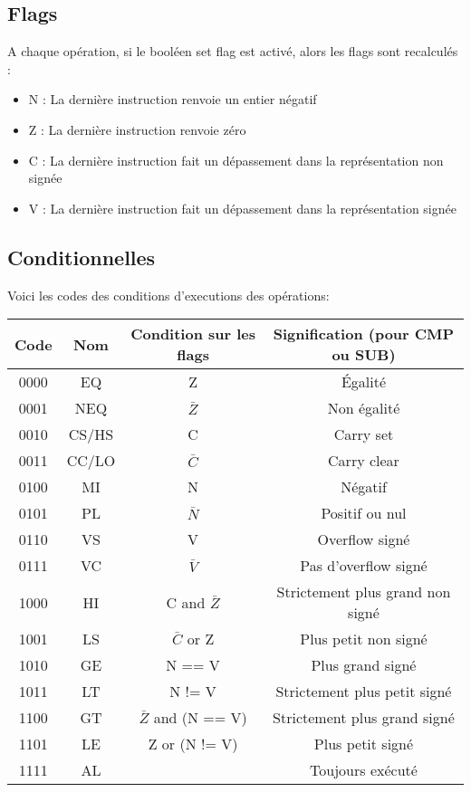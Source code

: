 \documentclass[a4paper]{article}
\begin{document}
\subsection{Flags}

A chaque opération, si le booléen set flag est activé, alors les flags sont
recalculés :
  \begin{itemize}
  \item N : La dernière instruction renvoie un entier négatif
  \item Z : La dernière instruction renvoie zéro
  \item C : La dernière instruction fait un dépassement dans la représentation
    non signée
  \item V : La dernière instruction fait un dépassement dans la représentation
    signée 
  \end{itemize}

  \subsection{Conditionnelles}

  Voici les codes des conditions d'executions des opérations:\\
  
\begin{tabular}{|c|c|c|c|}
  \hline
  Code & Nom & Condition sur les flags & Signification (pour CMP ou SUB)\\
  \hline
  0000 & EQ & Z & Égalité\\
  0001 & NEQ & $\bar{Z}$ & Non égalité\\
  0010 & CS/HS & C & Carry set\\
  0011 & CC/LO & $\bar{C}$ & Carry clear\\
  0100 & MI & N & Négatif \\
  0101 & PL & $\bar{N}$ & Positif ou nul \\
  0110 & VS & V & Overflow signé \\
  0111 & VC & $\bar{V}$ & Pas d'overflow signé \\
  1000 & HI & C and $\bar{Z}$ & Strictement plus grand non signé \\
  1001 & LS & $\bar{C}$ or Z & Plus petit non signé \\
  1010 & GE & N == V & Plus grand signé \\
  1011 & LT & N != V & Strictement plus petit signé\\
  1100 & GT & $\bar{Z}$ and (N == V) & Strictement plus grand signé \\
  1101 & LE & Z or (N != V) & Plus petit signé \\
  1111 & AL &  & Toujours exécuté \\
  \hline
\end{tabular}
\end{document}
